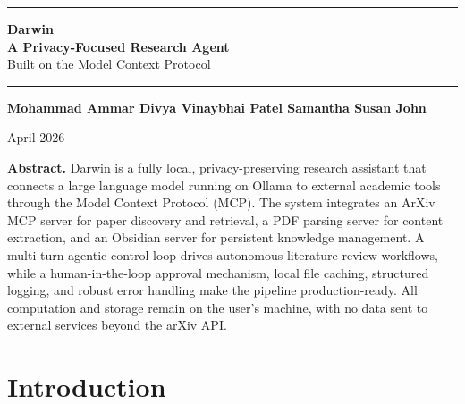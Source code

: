 \documentclass[12pt, a4paper]{article}
\begin{document}
\begin{titlepage}
\centering
\vspace*{2.5cm}

{\color{darwinblue}\rule{\linewidth}{2.5pt}}
\vspace{0.8cm}

{\Huge\bfseries\color{darwindark} Darwin}\\[0.4em]
{\LARGE\bfseries\color{darwinblue} A Privacy-Focused Research Agent}\\[0.3em]
{\large\color{greytext} Built on the Model Context Protocol}

\vspace{0.8cm}
{\color{darwinblue}\rule{\linewidth}{2.5pt}}
\vspace{1.8cm}

{\large\bfseries Mohammad Ammar \quad Divya Vinaybhai Patel \quad Samantha Susan John}

\vspace{0.6cm}
{\color{greytext} April 2026}

\vfill

\begin{mdframed}[
    backgroundcolor = darwinlight,
    linecolor       = darwinblue,
    linewidth       = 1pt,
    innerleftmargin = 18pt,
    innerrightmargin= 18pt,
    innertopmargin  = 12pt,
    innerbottommargin= 12pt,
]
\setlength{\parskip}{4pt}
\textbf{Abstract.}
Darwin is a fully local, privacy-preserving research assistant that connects a large language model running on Ollama to external academic tools through the Model Context Protocol (MCP). The system integrates an ArXiv MCP server for paper discovery and retrieval, a PDF parsing server for content extraction, and an Obsidian server for persistent knowledge management. A multi-turn agentic control loop drives autonomous literature review workflows, while a human-in-the-loop approval mechanism, local file caching, structured logging, and robust error handling make the pipeline production-ready. All computation and storage remain on the user's machine, with no data sent to external services beyond the arXiv API.
\end{mdframed}

\end{titlepage}

\tableofcontents
\newpage

\section{Introduction}
\end{document}
